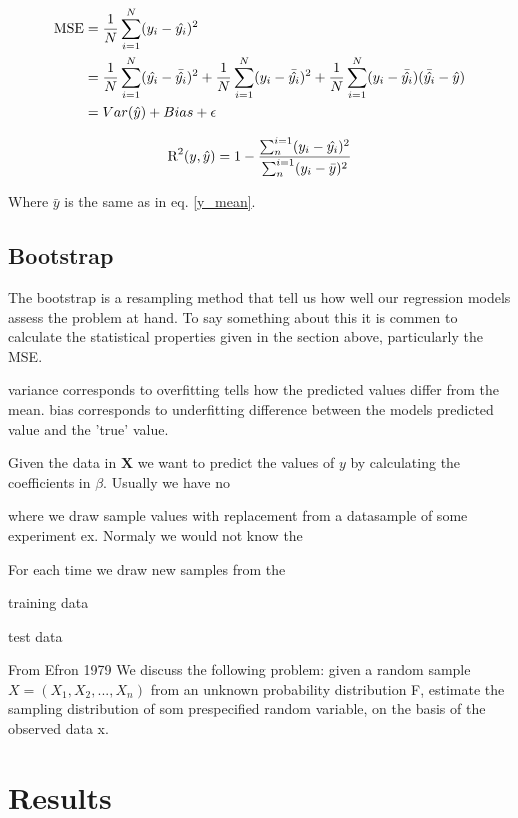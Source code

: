 \documentclass[a4paper,12pt, english]{article}
\begin{document}
\begin{align}
\textnormal{MSE} &= \frac{1}{N} \sum_{i=1}^N (y_i - \hat{y_i})^2 \\
&= \frac{1}{N} \sum_{i=1}^N (\hat{y_i} - \bar{\hat{y_i}})^2 + \frac{1}{N} \sum_{i=1}^N (y_i - \bar{\hat{y_i}})^2 + \frac{1}{N} \sum_{i=1}^N (y_i - \bar{\hat{y_i}})(\bar{\hat{y_i}} - \hat{y}) \\
&= Var(\hat{y}) + Bias + \epsilon
\end{align}

\begin{equation}
\textnormal{R}^2(y,\hat{y}) = 1 - \frac{\sum_{n}^{i=1} (y_i - \hat{y_i})^2}{\sum_{n}^{i=1}(y_i - \bar{y})^2}
\end{equation}

Where $\bar{y}$ is the same as in eq. \ref{y_mean}.


\subsection*{Bootstrap}

The bootstrap is a resampling method that tell us how well our regression models assess the problem at hand. To say something about this it is commen to calculate the statistical properties given in the section above, particularly the MSE.  

variance corresponds to overfitting 
tells how the predicted values differ from the mean.
bias corresponds to underfitting 
difference between the 	models predicted value and the 'true' value.

 
Given the data in $\mathbf{X}$ we want to predict the values of $y$ by calculating the coefficients in $\beta$. 
Usually we have no 

where we draw sample values with replacement from a datasample of some experiment ex. Normaly we would not know the 

For each time we draw new samples from the 

training data 

test data 

From Efron 1979
We discuss the following problem: given a random sample $X = (X_1, X_2,..., X_n)$ from an unknown probability distribution F, estimate the sampling distribution of som prespecified random variable, on the basis of the observed data x.

\section*{Results}
\end{document}
